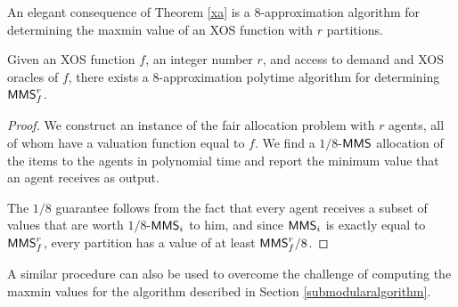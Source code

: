 An elegant consequence of Theorem \ref{xa} is a $8$-approximation algorithm for determining the maxmin value of an XOS function with $r$ partitions.
\begin{corollary}
	Given an XOS function $f$, an integer number $r$, and access to demand and XOS oracles of $f$, there exists a $8$-approximation polytime algorithm for determining $\mathsf{MMS}^r_f$.
\end{corollary}
\begin{proof}
	We construct an instance of the fair allocation problem with $r$ agents, all of whom have a valuation function equal to $f$. We find a $1/8$-$\mathsf{MMS}$ allocation of the items to the agents in polynomial time and report the minimum value that an agent receives as output.
	
	The $1/8$ guarantee follows from the fact that every agent receives a subset of values that are worth $1/8$-$\mathsf{MMS}_i$ to him, and since $\mathsf{MMS}_i$ is exactly equal to $\mathsf{MMS}^r_f$, every partition has a value of at least $\mathsf{MMS}^r_f/8$.
\end{proof}
\begin{remark}
	A similar procedure can also be used to overcome the challenge of computing the maxmin values for the algorithm described in Section \ref{submodularalgorithm}.
\end{remark}